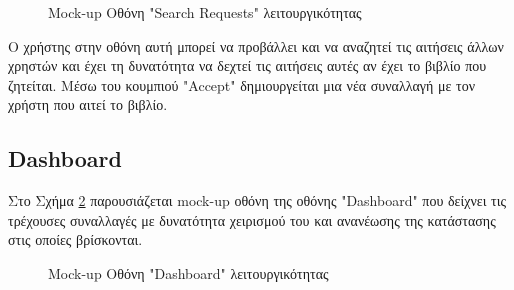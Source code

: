 \documentclass[12pt,a4paper]{article}
\begin{document}
\begin{figure}[H]
	\caption{Mock-up Οθόνη "Search Requests" λειτουργικότητας}
	\label{Mock-up Οθόνη "Search Requests" λειτουργικότητας}
\end{figure}

Ο χρήστης στην οθόνη αυτή μπορεί να προβάλλει και να αναζητεί τις αιτήσεις άλλων χρηστών και έχει τη δυνατότητα να δεχτεί τις αιτήσεις αυτές αν έχει το βιβλίο που ζητείται. Μέσω του κουμπιού "Accept" δημιουργείται μια νέα συναλλαγή με τον χρήστη που αιτεί το βιβλίο.

\subsection{Dashboard}

Στο Σχήμα \ref{Mock-up Οθόνη "Dashboard" λειτουργικότητας} παρουσιάζεται mock-up οθόνη της οθόνης "Dashboard" που δείχνει τις τρέχουσες συναλλαγές με δυνατότητα χειρισμού του και ανανέωσης της κατάστασης στις οποίες βρίσκονται.

\begin{figure}[H]
	\caption{Mock-up Οθόνη "Dashboard" λειτουργικότητας}
	\label{Mock-up Οθόνη "Dashboard" λειτουργικότητας}
\end{figure}
\end{document}
